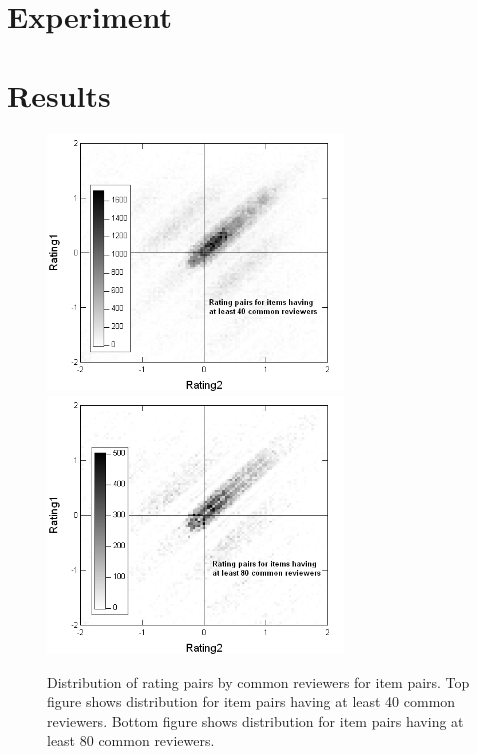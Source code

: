 \documentclass[11pt]{article}
\begin{document}
\section*{Experiment}

\section*{Results}

\begin{figure}[!htbp]
    \centering
    \includegraphics[width=0.7\textwidth]{RatingDist_40.png}
    \includegraphics[width=0.7\textwidth]{RatingDist_80.png}
	\caption{Distribution of rating pairs by common reviewers for item pairs.
Top figure shows distribution for item pairs having at least 40 common
reviewers. Bottom figure shows distribution for item pairs having at least 80
common reviewers.}
    \label{fig:RatingDist}
\end{figure}
\end{document}
